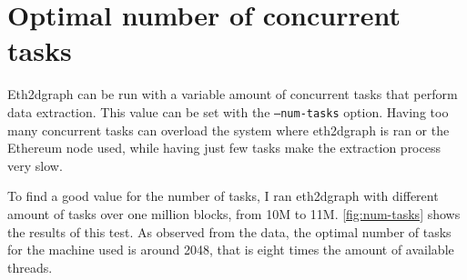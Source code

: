 \section{Optimal number of concurrent tasks}

Eth2dgraph can be run with a variable amount of concurrent tasks that perform data extraction. This value can be set with the {\tt --num-tasks} option. Having too many concurrent tasks can overload the system where eth2dgraph is ran or the Ethereum node used, while having just few tasks make the extraction process very slow. 

To find a good value for the number of tasks, I ran eth2dgraph with different amount of tasks over one million blocks, from 10M to 11M. \cref{fig:num-tasks} shows the results of this test. As observed from the data, the optimal number of tasks for the machine used is around 2048, that is eight times the amount of available threads.

